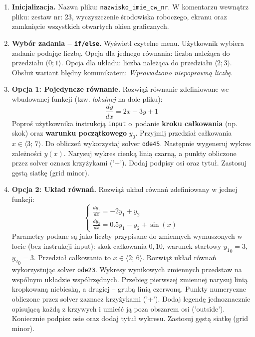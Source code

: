 \documentclass[a4paper,11pt]{article}
\begin{document}
\begin{enumerate}[leftmargin=*, label=\textbf{\arabic*.}, itemsep=2pt]

  \item \textbf{Inicjalizacja.}
    Nazwa pliku: \texttt{nazwisko\_imie\_cw\_nr}. W komentarzu wewnątrz pliku: zestaw nr: 23, wyczyszczenie środowiska roboczego, ekranu oraz zamknięcie wszystkich otwartych okien graficznych.

  \item \textbf{Wybór zadania -- \texttt{if/else}.}
    Wyświetl czytelne menu. Użytkownik wybiera zadanie podając liczbę. Opcja dla jednego równania: liczba należąca do przedziału $(0; 1\rangle$. Opcja dla układu: liczba należąca do przedziału $\langle 2; 3)$. Obsłuż wariant błędny komunikatem: \textit{Wprowadzono niepoprawną liczbę}.

  \item \textbf{Opcja 1: Pojedyncze równanie.}
    Rozwiąż równanie zdefiniowane we wbudowanej funkcji (tzw. \textit{lokalnej} na dole pliku):
    \[ \frac{dy}{dx} = 2x - 3y + 1 \]
    Poproś użytkownika instrukcją \texttt{input} o~podanie \textbf{kroku całkowania} (np. skok) oraz \textbf{warunku początkowego} $y_0$. Przyjmij przedział całkowania $x \in \langle 3;\,7 \rangle$.
    Do obliczeń wykorzystaj solver \texttt{ode45}. Następnie wygeneruj wykres zależności $y(x)$. Narysuj wykres cienką linią czarną, a punkty obliczone przez solver oznacz krzyżykami ('+'). Dodaj podpisy osi oraz tytuł. Zastosuj gęstą siatkę (grid minor).

  \item \textbf{Opcja 2: Układ równań.}
    Rozwiąż układ równań zdefiniowany w jednej funkcji:\\[-0.5em]
    \[
    \begin{cases}
      \frac{dy_1}{dx} = -2y_1 + y_2 \\
      \frac{dy_2}{dx} = 0.5y_1 - y_2 + \sin(x)
    \end{cases}
    \]
    Parametry podane są jako liczby przypisane do zmiennych wymuszonych w locie (bez instrukcji input): skok całkowania $0{,}10$, warunek startowy $ {y_1}_{0} = 3 $, $ {y_2}_{0} = 3 $. Przedział całkowania to $x \in \langle 2;\,6 \rangle$.
    Rozwiąż układ równań wykorzystując solver \texttt{ode23}. Wykresy wynikowych zmiennych przedstaw na wspólnym układzie współrzędnych. Przebieg pierwszej zmiennej narysuj linią kropkowaną niebieską, a drugiej -- grubą linią czerwoną. Punkty numeryczne obliczone przez solver zaznacz krzyżykami ('+'). Dodaj legendę jednoznacznie opisującą każdą z krzywych i umieść ją poza obszarem osi ('outside'). Koniecznie podpisz osie oraz dodaj tytuł wykresu. Zastosuj gęstą siatkę (grid minor).

\end{enumerate}
\end{document}
